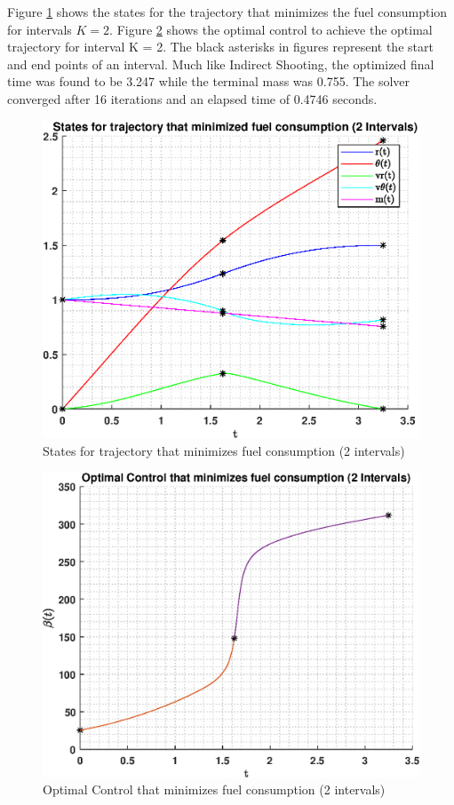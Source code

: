 \documentclass[]{article}
\begin{document}
Figure \ref{fig:indirectMultiStates} shows the states for the trajectory that minimizes the fuel consumption for intervals \(K = 2\). Figure \ref{fig:indirectMultiControl} shows the optimal control to achieve the optimal trajectory for interval K = 2. The black asterisks in figures represent the start and end points of an interval. Much like Indirect Shooting, the optimized final time was found to be 3.247 while the terminal mass was 0.755. The solver converged after 16 iterations and an elapsed time of 0.4746 seconds.
\begin{figure}[hbt!]
	\centering
	\includegraphics[scale=0.75]{indirectMultiStates.eps}
	\caption{States for trajectory that minimizes fuel consumption (2 intervals)}
	\label{fig:indirectMultiStates}
\end{figure}
\begin{figure}
	\centering
	\includegraphics[scale=0.75]{indirectMultiControl.eps}
	\caption{Optimal Control that minimizes fuel consumption (2 intervals)}
	\label{fig:indirectMultiControl}
\end{figure}
\FloatBarrier
\end{document}
